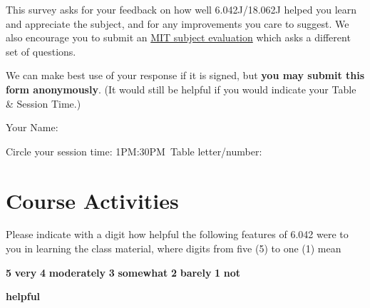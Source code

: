 \documentclass[handout]{mcs}
\begin{document}

This survey asks for your feedback on how well 6.042J/18.062J helped
you learn and appreciate the subject, and \iffalse .  Comparing
student self-assessments given in this survey to student grades helps
us determine how to improve the course.  We would also be grateful\fi
for any improvements you care to suggest.  We also encourage you to
submit an
\href{http://web.mit.edu/subjectevaluation/evaluate.html}{MIT subject
  evaluation} which asks a different set of questions.

We can make best use of your response if it is signed, but \textbf{you
  may submit this form anonymously}.  (It would still be helpful if
you would indicate your Table \& Session Time.)

\large{Your Name:} \brule{4in}

Circle your session time: 1PM:30PM\qquad\  Table letter/number: \brule{0.5in}

\section*{Course Activities}

Please indicate with a digit how helpful the following features of
6.042 were to you in learning the class material, where digits from
five (5) to one (1) mean
\begin{center}
\textbf{5}  \textbf{very} \qquad
\textbf{4}  \textbf{moderately}\qquad
\textbf{3} \textbf{somewhat}\qquad
\textbf{2} \textbf{barely}\qquad
\textbf{1} \textbf{not}

  \textbf{helpful}
\end{center}

\iffalse
 How helpful have the following aspects of the course been in
achieving the subject outcomes for you personally:
\fi
\end{document}
